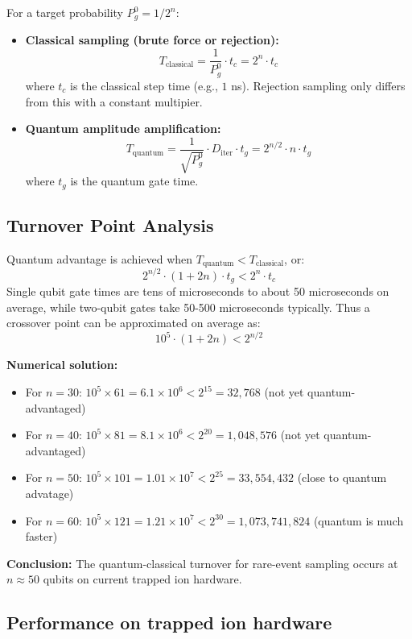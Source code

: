 \documentclass[encoding=utf8,british]{tumphthesis}
\begin{document}
For a target probability $P_g^0 = 1/2^n$:

\begin{itemize}
    \item \textbf{Classical sampling (brute force or rejection):}
        \[
        T_{\text{classical}} = \frac{1}{P_g^0} \cdot t_c = 2^n \cdot t_c
        \]
        where $t_c$ is the classical step time (e.g., $1$ ns). Rejection sampling only differs
        from this with a constant multipier.
    \item \textbf{Quantum amplitude amplification:}
        \[
        T_{\text{quantum}} = \frac{1}{\sqrt{P_g^0}} \cdot D_{\text{iter}} \cdot t_g = 2^{n/2} \cdot n \cdot t_g
        \]
        where $t_g$ is the quantum gate time.
\end{itemize}

\subsection{Turnover Point Analysis}

Quantum advantage is achieved when $T_{\text{quantum}} < T_{\text{classical}}$, or:
\[
2^{n/2} \cdot (1 + 2n) \cdot t_g < 2^n \cdot t_c
\]
Single qubit gate times are tens of microseconds to about 50 microseconds on average, while two-qubit gates take 50-500 microseconds typically.
Thus a crossover point can be approximated on average as:
\[
10^5 \cdot (1 + 2n) < 2^{n/2}
\]

\textbf{Numerical solution:}
\begin{itemize}
    \item For $n=30$: $10^5 \times 61 = 6.1 \times 10^6 < 2^{15} = 32,768$ (not yet quantum-advantaged)
    \item For $n=40$: $10^5 \times 81 = 8.1 \times 10^6 < 2^{20} = 1,048,576$ (not yet quantum-advantaged)
    \item For $n=50$: $10^5 \times 101 = 1.01 \times 10^7 < 2^{25} = 33,554,432$ (close to quantum advatage)
    \item For $n=60$: $10^5 \times 121 = 1.21 \times 10^7 < 2^{30} = 1,073,741,824$ (quantum is much faster)
\end{itemize}

\noindent
\textbf{Conclusion:} The quantum-classical turnover for rare-event sampling occurs at \linebreak $n \approx 50$ qubits on current 
trapped ion hardware.  

\subsection{Performance on trapped ion hardware}
\end{document}

